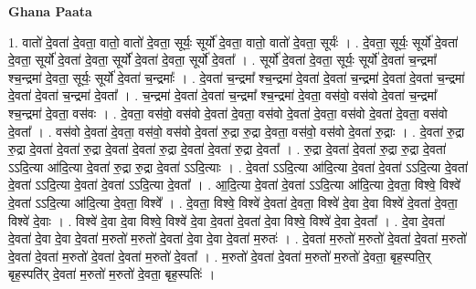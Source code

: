 \documentclass[17pt]{extarticle}
\begin{document}
\textbf{Ghana Paata } \newline

1. वातो॑ दे॒वता॑ दे॒वता॒ वातो॒ वातो॑ दे॒वता॒ सूर्यः॒ सूर्यो॑ दे॒वता॒ वातो॒ वातो॑ दे॒वता॒ सूर्यः॑ । . दे॒वता॒ सूर्यः॒ सूर्यो॑ दे॒वता॑ दे॒वता॒ सूर्यो॑ दे॒वता॑ दे॒वता॒ सूर्यो॑ दे॒वता॑ दे॒वता॒ सूर्यो॑ दे॒वता᳚ । . सूर्यो॑ दे॒वता॑ दे॒वता॒ सूर्यः॒ सूर्यो॑ दे॒वता॑ च॒न्द्रमा᳚ श्च॒न्द्रमा॑ दे॒वता॒ सूर्यः॒ सूर्यो॑ दे॒वता॑ च॒न्द्रमाः᳚ । . दे॒वता॑ च॒न्द्रमा᳚ श्च॒न्द्रमा॑ दे॒वता॑ दे॒वता॑ च॒न्द्रमा॑ दे॒वता॑ दे॒वता॑ च॒न्द्रमा॑ दे॒वता॑ दे॒वता॑ च॒न्द्रमा॑ दे॒वता᳚ । . च॒न्द्रमा॑ दे॒वता॑ दे॒वता॑ च॒न्द्रमा᳚ श्च॒न्द्रमा॑ दे॒वता॒ वस॑वो॒ वस॑वो दे॒वता॑ च॒न्द्रमा᳚ श्च॒न्द्रमा॑ दे॒वता॒ वस॑वः । . दे॒वता॒ वस॑वो॒ वस॑वो दे॒वता॑ दे॒वता॒ वस॑वो दे॒वता॑ दे॒वता॒ वस॑वो दे॒वता॑ दे॒वता॒ वस॑वो दे॒वता᳚ । . वस॑वो दे॒वता॑ दे॒वता॒ वस॑वो॒ वस॑वो दे॒वता॑ रु॒द्रा रु॒द्रा दे॒वता॒ वस॑वो॒ वस॑वो दे॒वता॑ रु॒द्राः । . दे॒वता॑ रु॒द्रा रु॒द्रा दे॒वता॑ दे॒वता॑ रु॒द्रा दे॒वता॑ दे॒वता॑ रु॒द्रा दे॒वता॑ दे॒वता॑ रु॒द्रा दे॒वता᳚ । . रु॒द्रा दे॒वता॑ दे॒वता॑ रु॒द्रा रु॒द्रा दे॒वता॑ ऽऽदि॒त्या आ॑दि॒त्या दे॒वता॑ रु॒द्रा रु॒द्रा दे॒वता॑ ऽऽदि॒त्याः । . दे॒वता॑ ऽऽदि॒त्या आ॑दि॒त्या दे॒वता॑ दे॒वता॑ ऽऽदि॒त्या दे॒वता॑ दे॒वता॑ ऽऽदि॒त्या दे॒वता॑ दे॒वता॑ ऽऽदि॒त्या दे॒वता᳚ । . आ॒दि॒त्या दे॒वता॑ दे॒वता॑ ऽऽदि॒त्या आ॑दि॒त्या दे॒वता॒ विश्वे॒ विश्वे॑ दे॒वता॑ ऽऽदि॒त्या आ॑दि॒त्या दे॒वता॒ विश्वे᳚ । . दे॒वता॒ विश्वे॒ विश्वे॑ दे॒वता॑ दे॒वता॒ विश्वे॑ दे॒वा दे॒वा विश्वे॑ दे॒वता॑ दे॒वता॒ विश्वे॑ दे॒वाः । . विश्वे॑ दे॒वा दे॒वा विश्वे॒ विश्वे॑ दे॒वा दे॒वता॑ दे॒वता॑ दे॒वा विश्वे॒ विश्वे॑ दे॒वा दे॒वता᳚ । . दे॒वा दे॒वता॑ दे॒वता॑ दे॒वा दे॒वा दे॒वता॑ म॒रुतो॑ म॒रुतो॑ दे॒वता॑ दे॒वा दे॒वा दे॒वता॑ म॒रुतः॑ । . दे॒वता॑ म॒रुतो॑ म॒रुतो॑ दे॒वता॑ दे॒वता॑ म॒रुतो॑ दे॒वता॑ दे॒वता॑ म॒रुतो॑ दे॒वता॑ दे॒वता॑ म॒रुतो॑ दे॒वता᳚ । . म॒रुतो॑ दे॒वता॑ दे॒वता॑ म॒रुतो॑ म॒रुतो॑ दे॒वता॒ बृह॒स्पति॒र् बृह॒स्पति॑र् दे॒वता॑ म॒रुतो॑ म॒रुतो॑ दे॒वता॒ बृह॒स्पतिः॑ । \newline
\end{document}
